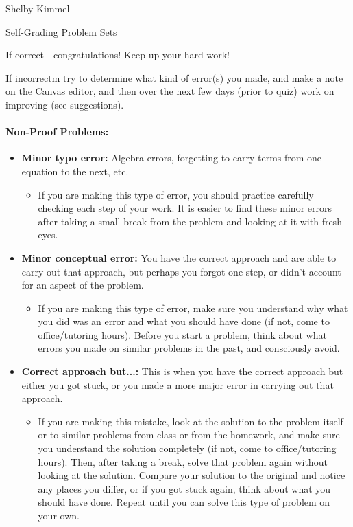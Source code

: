 \documentclass[12pt]{article}
\begin{document}
\hfill Shelby Kimmel

\begin{center}
{\huge Self-Grading Problem Sets}
\end{center}

If correct - congratulations! Keep up your hard work!


If incorrectm try to determine what kind of error(s) you made, and make a note on the Canvas editor, and then over the next few days (prior to quiz) work on improving (see suggestions).

\paragraph{{\Large{Non-Proof Problems:}}}

\begin{itemize}
\item \textbf{Minor typo error:} Algebra errors, forgetting to carry terms from one equation to the next, etc. 
\begin{itemize}
\item If you are making this type of error, you should practice carefully checking each step of your work. It is easier to find these minor errors after taking a small break from the problem and looking at it with fresh eyes.
\end{itemize}
\item \textbf{Minor conceptual error:} You have the correct approach and are able to carry out that approach, but perhaps you forgot one step, or didn't account for an aspect of the problem. 
\begin{itemize}
\item If you are making this type of error, make sure you understand why what you did was an error and what you should have done (if not, come to office/tutoring hours). Before you start a problem, think about what errors you made on similar problems in the past, and consciously avoid.
\end{itemize}
\item \textbf{Correct approach but...:} This is when you have the correct approach but either you got stuck, or you made a more major error in carrying out that approach. 
\begin{itemize}
\item If you are making this mistake, look at the solution to the problem itself or to similar problems from class or from the homework, and make sure you understand the solution completely (if not, come to office/tutoring hours). Then, after taking a break, solve that problem again without looking at the solution. Compare your solution to the original and notice any places you differ, or if you got stuck again, think about what you should have done. Repeat until you can solve this type of problem on your own.

\end{itemize}
\end{itemize}
\end{document}
